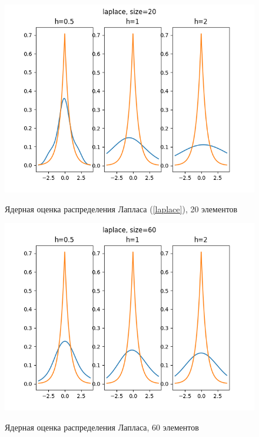 \documentclass[12pt,a4paper]{article}
\begin{document}
			\begin{figure}[htp]
				{\includegraphics[width=1\linewidth]{../plots/laplace_20.png}}
				\caption{Ядерная оценка распределения Лапласа (\ref{laplace}), 20 элементов}
			\end{figure}
			\begin{figure}
				{\includegraphics[width=1\linewidth]{../plots/laplace_60.png}}
				\caption{Ядерная оценка распределения Лапласа, 60 элементов}
			\end{figure}
		
\end{document}
